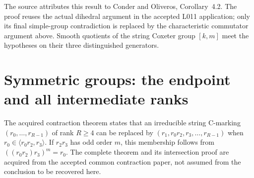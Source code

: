 \documentclass[11pt,a4paper]{article}
\newcommand{\gen}[1]{\langle #1\rangle}
\begin{document}
The source attributes this result to Conder and Oliveros, Corollary~4.2.
The proof reuses the actual dihedral argument in the accepted L011 application;
only its final simple-group contradiction is replaced by the characteristic
commutator argument above. Smooth quotients of the string Coxeter group
$[k,m]$ meet the hypotheses on their three distinguished generators.

\section{Symmetric groups: the endpoint and all intermediate ranks}
The acquired contraction theorem states that an irreducible string C-marking
$(r_0,\ldots,r_{R-1})$ of rank $R\ge4$ can be replaced by
$(r_1,r_0r_2,r_3,\ldots,r_{R-1})$ when
$r_0\in\gen{r_0r_2,r_3}$. If $r_2r_3$ has odd order $m$, this membership
follows from $((r_0r_2)r_3)^m=r_0$. The complete theorem and its intersection
proof are acquired from the accepted common contraction paper, not assumed
from the conclusion to be recovered here.
\end{document}
